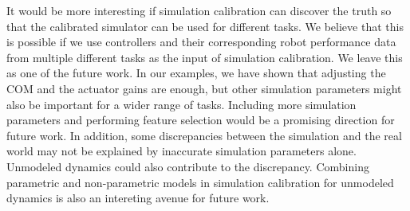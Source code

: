 It would be more interesting if simulation calibration can discover the truth so that the calibrated simulator can be used for different tasks. We believe that this is possible if we use controllers and their corresponding robot performance data from multiple different tasks as the input of simulation calibration. We leave this as one of the future work. In our examples, we have shown that adjusting the COM and the actuator gains are enough, but other simulation parameters might also be important for a wider range of tasks. Including more simulation parameters and performing feature selection would be a promising direction for future work. In addition, some discrepancies between the simulation and the real world may not be explained by inaccurate simulation parameters alone. Unmodeled dynamics could also contribute to the discrepancy. Combining parametric and non-parametric models in simulation calibration for unmodeled dynamics is also an intereting avenue for future work.
